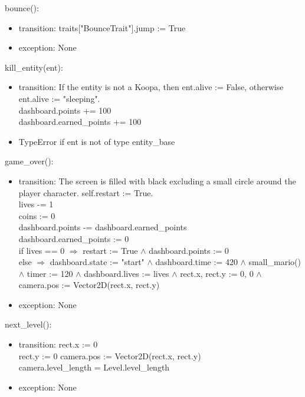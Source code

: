 \documentclass[12pt]{article}
\begin{document}
\color{black}

bounce():
\begin{itemize}
    \item transition: traits["BounceTrait"].jump := True
    \item exception: None
\end{itemize}

kill\_entity(ent):
\begin{itemize}
    \item transition: If the entity is not a Koopa, then ent.alive := False, otherwise ent.alive := "sleeping". \\
    \color{red}
    dashboard.points += 100\\
    dashboard.earned\_points += 100\\
    \color{black}
    \item TypeError if ent is not of type entity\_base
\end{itemize}

game\_over():
\begin{itemize}
    \item transition: The screen is filled with black excluding a small circle around the player character. self.restart := True.\\
    \color{red}
    lives -= 1\\
    coins := 0\\
    dashboard.points -= dashboard.earned\_points\\
    dashboard.earned\_points := 0\\
    if lives == 0 $\Rightarrow$ restart := True $\land$ dashboard.points := 0\\
    else $\Rightarrow$ dashboard.state := "start" $\land$ dashboard.time := 420 $\land$ small\_mario() $\land$ timer := 120 $\land$ dashboard.lives := lives $\land$ rect.x, rect.y := 0, 0 $\land$ camera.pos := Vector2D(rect.x, rect.y)
    \color{black}
    \item exception: None
\end{itemize}

\color{red}
next\_level():
\begin{itemize}
    \item transition: rect.x := 0\\
    rect.y := 0
    camera.pos := Vector2D(rect.x, rect.y)\\
    camera.level\_length = Level.level\_length
    \item exception: None
\end{itemize}
\color{black}
\end{document}
